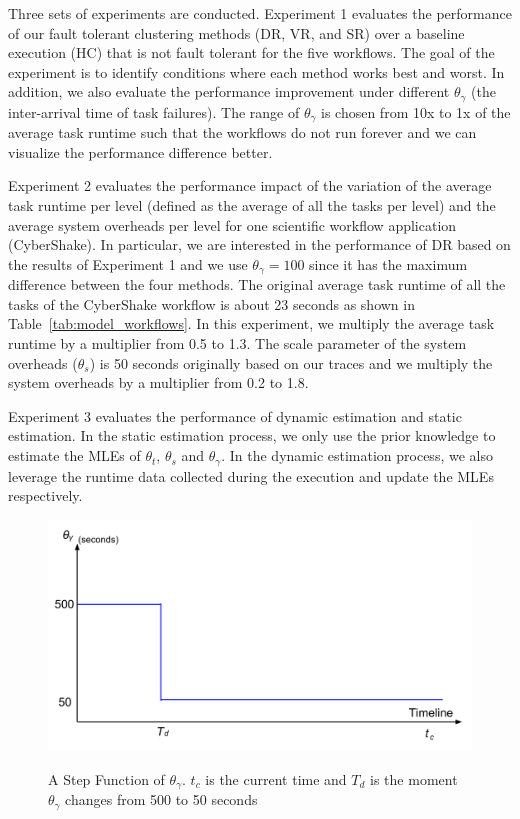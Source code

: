 Three sets of experiments are conducted. Experiment 1 evaluates the performance of our fault tolerant clustering methods (DR, VR, and SR) over a baseline execution (HC) that is not fault tolerant for the five workflows. The goal of the experiment is to identify conditions where each method works best and worst. In addition, we also evaluate the performance improvement under different $\theta_{\gamma}$ (the inter-arrival time of task failures). The range of $\theta_{\gamma}$ is chosen from 10x to 1x of the average task runtime such that the workflows do not run forever and we can visualize the performance difference better. 


Experiment 2 evaluates the performance impact of the variation of the average task runtime per level (defined as the average of all the tasks per level) and the average system overheads per level for one scientific workflow application (CyberShake). In particular, we are interested in the performance of DR based on the results of Experiment 1 and we use $\theta_{\gamma}=100$ since it has the maximum difference between the four methods. The original average task runtime of all the tasks of the CyberShake workflow is about 23 seconds as shown in Table~\ref{tab:model_workflows}. In this experiment, we multiply the average task runtime by a multiplier from 0.5 to 1.3. The scale parameter of the system overheads ($\theta_{s}$) is 50 seconds originally based on our traces and we multiply the system overheads by a multiplier from 0.2 to 1.8.  

Experiment 3 evaluates the performance of dynamic estimation and static estimation. In the static estimation process, we only use the prior knowledge to estimate the MLEs of $\theta_t$, $\theta_s$ and $\theta_{\gamma}$. In the dynamic estimation process, we also leverage the runtime data collected during the execution and update the MLEs respectively. 

\begin{figure}[htb]
	\centering
	\includegraphics[width=0.6\linewidth]{figures/tolerance/step_signal.pdf} \\
	\caption{A Step Function of $\theta_{\gamma}$. $t_c$ is the current time and $T_d$ is the moment $\theta_{\gamma}$ changes from 500 to 50 seconds}
	\label{fig:evaluation_step_signal}
\end{figure}

